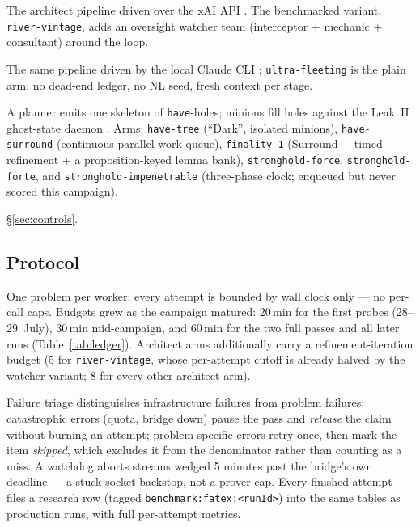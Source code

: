 \documentclass[12pt, a4paper]{article}
\newcommand{\run}[1]{\texttt{#1}}
\begin{document}
\begin{description}[itemsep=2pt]
  \item[River (Grok driver).] The architect pipeline driven over the xAI API
        \cite{xai2025grok41}. The benchmarked variant, \run{river-vintage},
        adds an oversight watcher team (interceptor + mechanic + consultant)
        around the loop.
  \item[Ultra (Claude CLI driver).] The same pipeline driven by the local
        Claude CLI \cite{anthropic2026sonnet5}; \run{ultra-fleeting} is the
        plain arm: no dead-end ledger, no NL seed, fresh context per stage.
  \item[Stronghold (flat-skeleton family).] A planner emits one skeleton of
        \texttt{have}-holes; minions fill holes against the Leak~II ghost-state
        daemon \cite{shen2026snapshot}. Arms: \run{have-tree} (``Dark'',
        isolated minions), \run{have-surround} (continuous parallel work-queue),
        \run{finality-1} (Surround + timed refinement + a proposition-keyed
        lemma bank), \run{stronghold-force}, \run{stronghold-forte}, and
        \run{stronghold-impenetrable} (three-phase clock; enqueued but never
        scored this campaign).
  \item[Controls.] \S\ref{sec:controls}.
\end{description}

\subsection{Protocol}
\label{sec:protocol}

One problem per worker; every attempt is bounded by wall clock only --- no
per-call caps. Budgets grew as the campaign matured: 20\,min for the first
probes (28--29~July), 30\,min mid-campaign, and 60\,min for the two full passes
and all later runs (Table~\ref{tab:ledger}). Architect arms additionally carry
a refinement-iteration budget (5 for \run{river-vintage}, whose per-attempt
cutoff is already halved by the watcher variant; 8 for every other architect
arm).

Failure triage distinguishes infrastructure failures from problem failures:
catastrophic errors (quota, bridge down) pause the pass and \emph{release} the
claim without burning an attempt; problem-specific errors retry once, then mark
the item \emph{skipped}, which excludes it from the denominator rather than
counting as a miss. A watchdog aborts streams wedged 5 minutes past the
bridge's own deadline --- a stuck-socket backstop, not a prover cap. Every
finished attempt files a research row (tagged
\run{benchmark:fatex:<runId>}) into the same tables as production runs,
with full per-attempt metrics.
\end{document}
